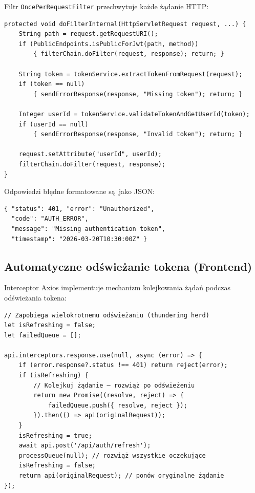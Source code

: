 Filtr \texttt{OncePerRequestFilter} przechwytuje każde żądanie HTTP:

\begin{verbatim}
protected void doFilterInternal(HttpServletRequest request, ...) {
    String path = request.getRequestURI();
    if (PublicEndpoints.isPublicForJwt(path, method))
        { filterChain.doFilter(request, response); return; }

    String token = tokenService.extractTokenFromRequest(request);
    if (token == null)
        { sendErrorResponse(response, "Missing token"); return; }

    Integer userId = tokenService.validateTokenAndGetUserId(token);
    if (userId == null)
        { sendErrorResponse(response, "Invalid token"); return; }

    request.setAttribute("userId", userId);
    filterChain.doFilter(request, response);
}
\end{verbatim}

Odpowiedzi błędne formatowane są~jako JSON:
\begin{verbatim}
{ "status": 401, "error": "Unauthorized",
  "code": "AUTH_ERROR",
  "message": "Missing authentication token",
  "timestamp": "2026-03-20T10:30:00Z" }
\end{verbatim}

\subsection{Automatyczne odświeżanie tokena (Frontend)}

Interceptor Axios implementuje mechanizm kolejkowania żądań podczas odświeżania tokena:

\begin{verbatim}
// Zapobiega wielokrotnemu odświeżaniu (thundering herd)
let isRefreshing = false;
let failedQueue = [];

api.interceptors.response.use(null, async (error) => {
    if (error.response?.status !== 401) return reject(error);
    if (isRefreshing) {
        // Kolejkuj żądanie — rozwiąż po odświeżeniu
        return new Promise((resolve, reject) => {
            failedQueue.push({ resolve, reject });
        }).then(() => api(originalRequest));
    }
    isRefreshing = true;
    await api.post('/api/auth/refresh');
    processQueue(null); // rozwiąż wszystkie oczekujące
    isRefreshing = false;
    return api(originalRequest); // ponów oryginalne żądanie
});
\end{verbatim}

